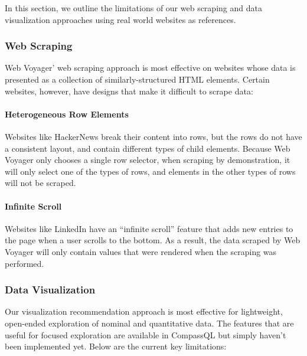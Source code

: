 \documentclass[sigconf,screen]{acmart}
\begin{document}
In this section, we outline the limitations of our web scraping and data
visualization approaches using real world websites as references.

\hypertarget{web-scraping-1}{%
\subsubsection{Web Scraping}\label{web-scraping-1}}

Web Voyager' web scraping approach is most effective on websites whose
data is presented as a collection of similarly-structured HTML elements.
Certain websites, however, have designs that make it difficult to scrape
data:

\hypertarget{heterogeneous-row-elements}{%
\paragraph{Heterogeneous Row
Elements}\label{heterogeneous-row-elements}}

Websites like HackerNews break their content into rows, but the rows do
not have a consistent layout, and contain different types of child
elements. Because Web Voyager only chooses a single row selector, when
scraping by demonstration, it will only select one of the types of rows,
and elements in the other types of rows will not be scraped.

\hypertarget{infinite-scroll}{%
\paragraph{Infinite Scroll}\label{infinite-scroll}}

Websites like LinkedIn have an ``infinite scroll'' feature that adds new
entries to the page when a user scrolls to the bottom. As a result, the
data scraped by Web Voyager will only contain values that were rendered
when the scraping was performed.

\hypertarget{data-visualization}{%
\subsubsection{Data Visualization}\label{data-visualization}}

Our visualization recommendation approach is most effective for
lightweight, open-ended exploration of nominal and quantitative data.
The features that are useful for focused exploration are available in
CompassQL but simply haven't been implemented yet. Below are the current
key limitations:
\end{document}
